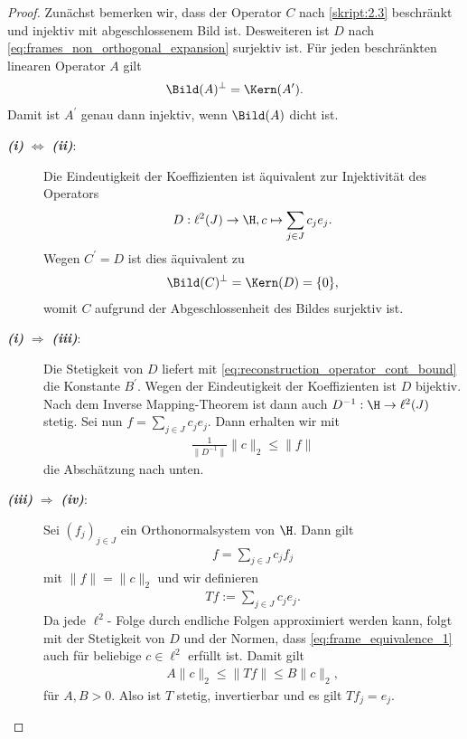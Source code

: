 \begin{proof}
	Zunächst bemerken wir, dass der Operator $ C $
	nach \ref{skript:2.3} beschränkt und injektiv mit abgeschlossenem Bild ist.
	Desweiteren ist $ D $ nach \eqref{eq:frames_non_orthogonal_expansion}	
	surjektiv ist.
	Für jeden beschränkten linearen Operator $ A $
	gilt
	\begin{align*}
	\Bild(A)^\perp = \Kern(A^\prime).
	\end{align*}
	Damit ist $ A^\prime $ genau dann injektiv, wenn $ \Bild(A) $ dicht ist.
	\begin{description}
		\item[\textbf{\textit{ \itshape\textrm{(i)}}} $ \Leftrightarrow $ \textbf{\textit{\textrm{(ii)}}}:]
		Die Eindeutigkeit der Koeffizienten ist äquivalent zur Injektivität des Operators
		\begin{align*}
		D : \ell^2(J) \to \H , c \mapsto
		\sum \limits_{j \in J} c_j e_j.
		\end{align*}
		Wegen $ C^\prime = D $ ist dies äquivalent zu 
		\begin{align*}
		\Bild(C)^\perp = \Kern(D) = \{0\},
		\end{align*}
		womit $ C  $ aufgrund der Abgeschlossenheit des Bildes surjektiv ist.
		
		\item[\textbf{\textit{ \itshape\textrm{(i)}}} $ \Rightarrow $ \textbf{\textit{\textrm{(iii)}}}:]
		Die Stetigkeit von $ D $ liefert mit
		\eqref{eq:reconstruction_operator_cont_bound}
		die Konstante $ B^\prime $.
		Wegen der Eindeutigkeit der Koeffizienten ist $ D $ bijektiv.
		Nach dem Inverse Mapping-Theorem ist dann auch $ D^{-1} : \H \to \ell^2(J) $ stetig.
		Sei nun $ f = \sum_{j \in J} c_j e_j $. Dann erhalten wir mit
		\begin{align*}
		\frac{1}{\| D^{-1} \|} \|c \|_2 \leq \| f \|
		\end{align*}
		die Abschätzung nach unten.
		
		\item[
		\textbf{\textit{ \itshape\textrm{(iii)}}} 
		$ \Rightarrow $ \textbf{\textit{\textrm{(iv)}}}:]
		Sei $ (f_j)_{j \in J} $ ein Orthonormalsystem von $ \H $. Dann gilt
		\begin{align*}
			f = \sum \limits_{j \in J} c_j f_j
		\end{align*}
		mit $ \| f \| = \| c \|_2 $ und wir definieren
		\begin{align*}
		T f := \sum \limits_{j \in J} c_j e_j.
		\end{align*}
		Da jede $ \ell^2 $- Folge durch endliche Folgen approximiert werden kann, folgt mit der Stetigkeit von $ D $ und der Normen, dass \eqref{eq:frame_equivalence_1} auch für beliebige $ c \in \ell^2 $ erfüllt ist. Damit gilt 
		\begin{align*}
		A \|c\|_2 \leq \| T f \| \leq B \| c \|_2,
		\end{align*}
		für $ A,B > 0 $. Also ist $ T $ stetig, invertierbar und es gilt $ T f_j = e_j $.
		

\end{description}
\end{proof}
